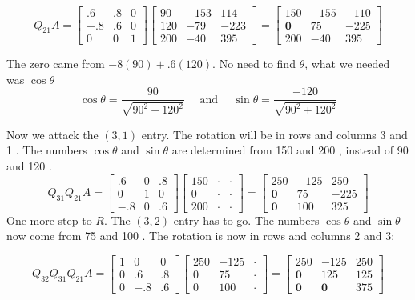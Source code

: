 \begin{example}[使用Givens进行QR分解]
    $$
    Q_{21} A=\left[\begin{array}{rrr}
    .6 & .8 & 0 \\
    -.8 & .6 & 0 \\
    0 & 0 & 1
    \end{array}\right]\left[\begin{array}{rrr}
    90 & -153 & 114 \\
    120 & -79 & -223 \\
    200 & -40 & 395
    \end{array}\right]=\left[\begin{array}{crr}
    150 & -155 & -110 \\
    \mathbf{0} & 75 & -225 \\
    200 & -40 & 395
    \end{array}\right]
    $$

    The zero came from $-8(90)+.6(120)$. No need to find $\theta$, what we needed was $\cos \theta$
$$
\cos \theta=\frac{90}{\sqrt{90^{2}+120^{2}}} \quad \text { and } \quad \sin \theta=\frac{-120}{\sqrt{90^{2}+120^{2}}}
$$

Now we attack the $(3,1)$ entry. The rotation will be in rows and columns 3 and 1 . The numbers $\cos \theta$ and $\sin \theta$ are determined from 150 and 200 , instead of 90 and 120 .
$$
Q_{31} Q_{21} A=\left[\begin{array}{rrr}
.6 & 0 & .8 \\
0 & 1 & 0 \\
-.8 & 0 & .6
\end{array}\right]\left[\begin{array}{rrr}
150 & \cdot & \cdot \\
0 & \cdot & \cdot \\
200 & \cdot & \cdot
\end{array}\right]=\left[\begin{array}{rrr}
250 & -125 & 250 \\
\mathbf{0} & 75 & -225 \\
\mathbf{0} & 100 & 325
\end{array}\right]
$$
One more step to $R$. The $(3,2)$ entry has to go. The numbers $\cos \theta$ and $\sin \theta$ now come from 75 and 100 . The rotation is now in rows and columns 2 and 3:


$$Q_{32} Q_{31} Q_{21} A=\left[\begin{array}{rrr}
    1 & 0 & 0 \\
    0 & .6 & .8 \\
    0 & -.8 & .6
    \end{array}\right]\left[\begin{array}{rrr}
    250 & -125 & \cdot \\
    0 & 75 & \cdot \\
    0 & 100 & \cdot
    \end{array}\right]=\left[\begin{array}{rrr}
    250 & -125 & 250 \\
    \mathbf{0} & 125 & 125 \\
    \mathbf{0} & \mathbf{0} & 375
    \end{array}\right]$$


\end{example}
